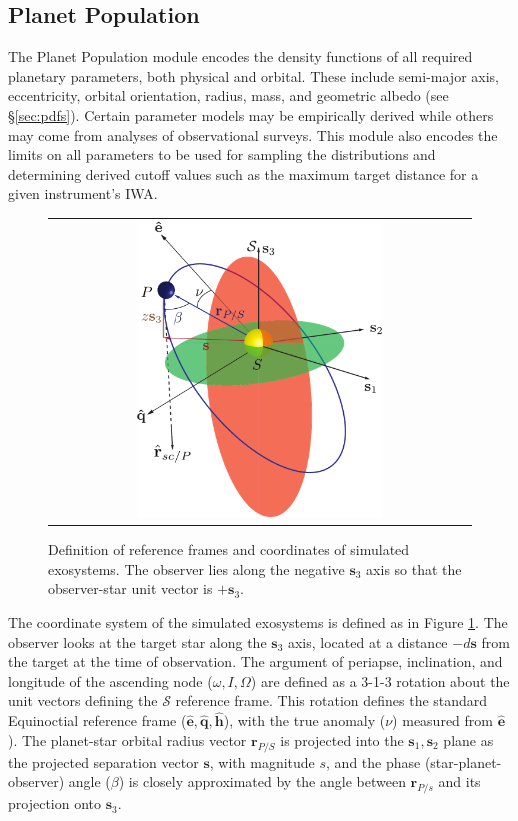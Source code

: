 \documentclass[cleanfoot]{asme2ej}
\def\mf{\mathbf}
\newcommand{\mfhat}[1]{\mf{\hat{#1}}}
\newcommand{\reffig}[1]{Figure \ref{#1}}
\begin{document}

\subsection{Planet Population}
The Planet Population module encodes the density functions of all required planetary parameters, both physical and orbital. These include semi-major axis, eccentricity, orbital orientation, radius, mass, and geometric albedo (see \S\ref{sec:pdfs}). Certain parameter models may be empirically derived while others may come from analyses of observational surveys.  This module also encodes the limits on all parameters to be used for sampling the distributions and determining derived cutoff values such as the maximum target distance for a given instrument's IWA.

\begin{figure}[ht]
    \begin{center}
        \begin{tabular}{c}
             \includegraphics[width=0.6\textwidth]{orbit_diagram}
        \end{tabular}
    \end{center}
    \caption{\label{fig:orbit_diagram} Definition of reference frames and coordinates of simulated exosystems.  The observer lies along the negative $\mf s_3$ axis so that the observer-star unit vector is $+\mf s_3$.}
\end{figure}

The coordinate system of the simulated exosystems is defined as in \reffig{fig:orbit_diagram}.  The observer looks at the target star along the $\mathbf{s}_3$ axis, located at a distance $-d\mathbf{s}$ from the target at the time of observation. The argument of periapse, inclination,  and longitude of the ascending node ($\omega, I, \Omega$) are defined as a 3-1-3 rotation about the unit vectors defining the $\mathcal{S}$ reference frame.  This rotation defines the standard Equinoctial reference frame ($\mfhat{e}, \mfhat{q}, \mfhat{h}$), with the true anomaly ($\nu$) measured from $\mfhat{e}$).  The planet-star orbital radius vector $\mf r_{P/S}$ is projected into the $\mf s_1, \mf s_2$ plane as the projected separation vector $\mf s$, with magnitude $s$, and the phase (star-planet-observer) angle ($\beta$) is closely approximated by the angle between $\mf r_{P/s}$ and its projection onto $\mf s_3$.
\end{document}
